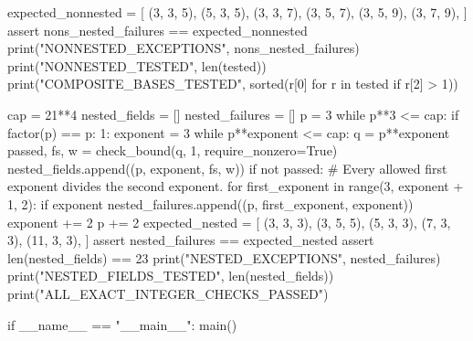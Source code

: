 \documentclass[11pt,a4paper]{article}
\begin{document}
\begin{CompleteProgram}
    expected_nonnested = [
        (3, 3, 5), (5, 3, 5),
        (3, 3, 7), (3, 5, 7),
        (3, 5, 9), (3, 7, 9),
    ]
    assert nons_nested_failures == expected_nonnested
    print("NONNESTED_EXCEPTIONS", nons_nested_failures)
    print("NONNESTED_TESTED", len(tested))
    print("COMPOSITE_BASES_TESTED", sorted({r[0] for r in tested if r[2] > 1}))

    cap = 21**4
    nested_fields = []
    nested_failures = []
    p = 3
    while p**3 <= cap:
        if factor(p) == {p: 1}:
            exponent = 3
            while p**exponent <= cap:
                q = p**exponent
                passed, fs, w = check_bound(q, 1, require_nonzero=True)
                nested_fields.append((p, exponent, fs, w))
                if not passed:
                    # Every allowed first exponent divides the second exponent.
                    for first_exponent in range(3, exponent + 1, 2):
                        if exponent %
                            nested_failures.append((p, first_exponent, exponent))
                exponent += 2
        p += 2
    expected_nested = [
        (3, 3, 3), (3, 5, 5),
        (5, 3, 3), (7, 3, 3), (11, 3, 3),
    ]
    assert nested_failures == expected_nested
    assert len(nested_fields) == 23
    print("NESTED_EXCEPTIONS", nested_failures)
    print("NESTED_FIELDS_TESTED", len(nested_fields))
    print("ALL_EXACT_INTEGER_CHECKS_PASSED")


if __name__ == "__main__":
    main()
\end{CompleteProgram}
\end{document}
